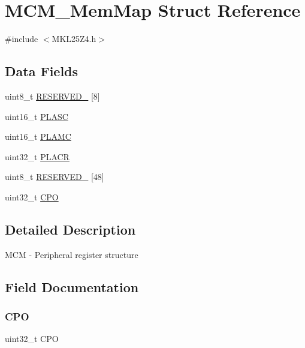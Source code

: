 \hypertarget{struct_m_c_m___mem_map}{}\section{M\+C\+M\+\_\+\+Mem\+Map Struct Reference}
\label{struct_m_c_m___mem_map}


{\ttfamily \#include $<$M\+K\+L25\+Z4.\+h$>$}

\subsection*{Data Fields}
\begin{DoxyCompactItemize}
\item 
uint8\+\_\+t \hyperlink{struct_m_c_m___mem_map_ab5b3e978eb3ceb8a2aadaeeab28db00b}{R\+E\+S\+E\+R\+V\+E\+D\+\_} \mbox{[}8\mbox{]}
\item 
uint16\+\_\+t \hyperlink{struct_m_c_m___mem_map_a20825db9d55d933be269bd35a200fd2d}{P\+L\+A\+SC}
\item 
uint16\+\_\+t \hyperlink{struct_m_c_m___mem_map_a93b5b2392197fc5d6806ef7d6c131068}{P\+L\+A\+MC}
\item 
uint32\+\_\+t \hyperlink{struct_m_c_m___mem_map_aa33a270057a47b918858749d81ff626c}{P\+L\+A\+CR}
\item 
uint8\+\_\+t \hyperlink{struct_m_c_m___mem_map_ad8a834e9c0be4b8a1f57679868c10f2d}{R\+E\+S\+E\+R\+V\+E\+D\+\_} \mbox{[}48\mbox{]}
\item 
uint32\+\_\+t \hyperlink{struct_m_c_m___mem_map_a35ef884d3cd29240febb8d3fc3df26d0}{C\+PO}
\end{DoxyCompactItemize}


\subsection{Detailed Description}
M\+CM -\/ Peripheral register structure 

\subsection{Field Documentation}
\mbox{\label{struct_m_c_m___mem_map_a35ef884d3cd29240febb8d3fc3df26d0}} 
\subsubsection{\texorpdfstring{C\+PO}{CPO}}
{\footnotesize\ttfamily uint32\+\_\+t C\+PO}

